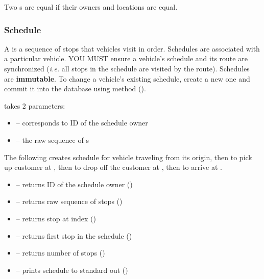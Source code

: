 
Two s are equal if their owners and locations are equal.

\subsubsection{Schedule}

A  is a sequence of stops that vehicles visit in order.
Schedules are associated with a particular vehicle. YOU MUST ensure a vehicle's
schedule and its route are synchronized (\emph{i.e.} all stops in the schedule
are visited by the route).  Schedules are \textbf{immutable}. To change a
vehicle's existing schedule, create a new one and commit it into the database
using method  ().

  takes 2 parameters:
\begin{itemize}
    \item[]  -- corresponds to ID of the schedule owner
    \item[]  -- the raw sequence of s
\end{itemize}

The following creates schedule  for vehicle  traveling from
its origin, then to pick up customer  at , then to
drop off the customer at , then to arrive at .

\begin{itemize}
    \item[]  -- returns ID of the schedule owner ()
    \item[]  -- returns raw sequence of stops ()
    \item[]  -- returns stop at index  ()
    \item[]  -- returns first stop in the schedule ()
    \item[]  -- returns number of stops ()
    \item[]  -- prints schedule to standard out ()
\end{itemize}


